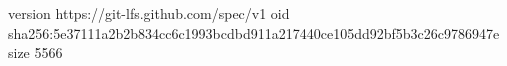 version https://git-lfs.github.com/spec/v1
oid sha256:5e37111a2b2b834cc6c1993bcdbd911a217440ce105dd92bf5b3c26c9786947e
size 5566
